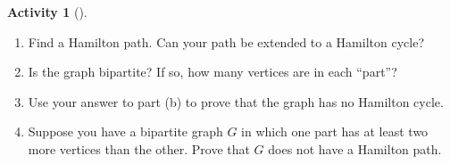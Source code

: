 \documentclass[10pt,]{book}
\theoremstyle{plain}
\theoremstyle{definition}
\theoremstyle{definition}
\theoremstyle{definition}
\newtheorem{activity}[project]{Activity}
\numberwithin{equation}{chapter}
\begin{document}
\begin{activity}[]
{%
}%
\begin{enumerate}[font=\bfseries,label=(\alph*),ref=\alph*]
\item\label{task-16} \hypertarget{p-196}{}%
Find a Hamilton path.  Can your path be extended to a Hamilton cycle?%
\item\label{task-17} \hypertarget{p-197}{}%
Is the graph bipartite? If so, how many vertices are in each ``part''?%
\item\label{task-18} \hypertarget{p-198}{}%
Use your answer to part (b) to prove that the graph has no Hamilton cycle.%
\item\label{task-19} \hypertarget{p-199}{}%
Suppose you have a bipartite graph \(G\) in which one part has at least two more vertices than the other.  Prove that \(G\) does not have a Hamilton path.%
\end{enumerate}
\end{activity}
\typeout{************************************************}
\typeout{************************************************}
\end{document}
